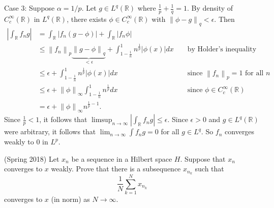 \documentclass[answers]{exam}
\theoremstyle{problemstyle}
\newcommand{\norm}[1]{\left\lVert#1\right\rVert} %
\newcommand{\1}[1]{\textbf{1}_{\left[#1\right]}} %
\def\R{\mathbb{R}} %
\begin{document}
\begin{questions}
\begin{solution}
  Case 3: Suppose $\alpha=1/p$. Let $g\in L^{q}(\R)$ where $\frac{1}{p}+\frac{1}{q}=1$. By density of $C_{c}^{\infty}(\R)$ in $L^{q}(\R)$, there exists $\phi\in C_{c}^{\infty}(\R)$ with $\norm{\phi-g}_{q}<\epsilon$. Then
  \begin{align*}
    \left|\int_{\R }f_{n}g\right|
    &= \int_{\R} |f_{n}(g-\phi)| + \int_{\R} |f_{n}\phi|\\
    &\leq \norm{f_{n}}_{p}\underbrace{\norm{g-\phi}_{q}}_{<\epsilon} + \int_{1-\frac{1}{n}}^{1}n^{\frac{1}{p}}|\phi(x)|dx
    &&\text{ by Holder's inequality}\\
    &\leq \epsilon + \int_{1-\frac{1}{n}}^{1}n^{\frac{1}{p}}|\phi(x)|dx
    &&\text{ since }\norm{f_{n}}_{p}= 1\text{ for all }n\\
    &\leq \epsilon + \norm{\phi}_{\infty}\int_{1-\frac{1}{n}}^{1}n^{\frac{1}{p}}dx
    &&\text{ since }\phi\in C_{c}^{\infty}(\R)\\
    &= \epsilon + \norm{\phi}_{\infty}n^{\frac{1}{p}-1}.
  \end{align*}
  Since $\frac{1}{p}<1$, it follows that $\limsup_{n\to\infty}\left| \int_{\R}f_{n}g\right| \leq \epsilon$. Since $\epsilon>0$ and $g\in L^{q}(\R)$ were arbitrary, it follows that $\lim_{n\to\infty} \int f_{n}g = 0$ for all $g\in L^{q}$. So $f_{n}$ converges weakly to $0$ in $L^{p}$.
\end{solution}


\item (Spring 2018) Let $x_{n}$ be a sequence in a Hilbert space $H$. Suppose that $x_{n}$ converges to $x$ weakly. Prove that there is a subsequence $x_{n_{k}}$ such that
\begin{equation*}
  \frac{1}{N}\sum_{k=1}^{N}x_{n_{k}}
\end{equation*}
converges to $x$ (in norm) as $N\to\infty$. 


\end{questions}
\end{document}
